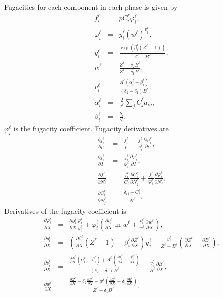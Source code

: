 Fugacities for each component in each phase is given by
\begin{eqnarray}
  f_i^\ell & = & p C_i^\ell \varphi_i^\ell, \\
  \varphi_i^\ell & = & y_i^\ell\left(w^\ell\right)^{v_i^\ell}, \\
  y_i^\ell & = & \frac{\exp\left(\beta_i^\ell (Z^\ell-1)\right)}
  {Z^\ell - B^\ell}, \\
  w^\ell & = & \frac{Z^\ell - \delta_2 B^\ell}{Z^\ell - \delta_1
    B^\ell}, \\
  v_i^\ell & = & \frac{A^\ell\left(\alpha_i^\ell-\beta_i^\ell\right)}
  {(\delta_2-\delta_1)B^\ell}, \\
  \alpha_i^\ell & = & \frac{2}{a^\ell}\sum_j C_j^\ell a_{ij}, \\
  \beta_i^\ell & = & \frac{b_i}{b^\ell}.
\end{eqnarray}
$\varphi_i^\ell$ is the fugacity coefficient. Fugacity derivatives are
\begin{eqnarray}
  \frac{\partial f_i^\ell}{\partial p} & = &
  \frac{f_i^\ell}{p} + \frac{f_i^\ell}{\varphi_i^\ell}
  \frac{\partial\varphi_i^\ell}{\partial p}, \\
  \frac{\partial f_i^\ell}{\partial T} & = &
  \frac{f_i^\ell}{\varphi_i^\ell}
  \frac{\partial\varphi_i^\ell}{\partial T}, \\
  \frac{\partial f_i^\ell}{\partial N_j^\ell} & = &
  \frac{f_i^\ell}{C_i^\ell} \frac{\partial C_i^\ell}{\partial N_j^\ell} +
  \frac{f_i^\ell}{\varphi_i^\ell}\frac{\partial\varphi_i^\ell}{\partial N_j^\ell}, \\
  \frac{\partial C_i^\ell}{\partial N_j^\ell} & = &
  \frac{\delta_{ij} - C_i^\ell}{N^\ell}.
\end{eqnarray}
Derivatives of the fugacity coefficient is
\begin{eqnarray}
  \frac{\partial\varphi_i^\ell}{\partial X} & = &
  \frac{\partial y_i^\ell}{\partial X} \frac{\varphi_i^\ell}{y_i^\ell} +
  \varphi_i^\ell\left(
    \frac{\partial v_i^\ell}{\partial X} \ln w^\ell +
    \frac{v_i^\ell}{w^\ell}\frac{\partial w^\ell}{\partial X}
  \right), \\
  \frac{\partial y_i^\ell}{\partial X} & = &
  \left(
    \frac{\partial\beta_i^\ell}{\partial X} (Z^\ell-1) +
    \beta_i^\ell \frac{\partial Z^\ell}{\partial X}
  \right) y_i^\ell -
  \frac{y_i^\ell}{Z^\ell-B^\ell}\left(
    \frac{\partial Z^\ell}{\partial X} -
    \frac{\partial B^\ell}{\partial X}
  \right), \\
  \frac{\partial v_i^\ell}{\partial X} & = &
  \frac{\frac{\partial A^\ell}{\partial
      X}\left(\alpha_i^\ell-\beta_i^\ell\right) +
    A^\ell\left(
      \frac{\partial\alpha_i^\ell}{\partial X} -
      \frac{\partial\beta_i^\ell}{\partial X}
    \right)}{\left(\delta_2-\delta_1\right) B^\ell} -
  \frac{v_i^\ell}{B^\ell}
  \frac{\partial B^\ell}{\partial X}, \\
  \frac{\partial w^\ell}{\partial X} & = &
  \frac{\frac{\partial Z^\ell}{\partial X} -
    \delta_2 \frac{\partial B^\ell}{\partial X}
    - w^\ell \left(
      \frac{\partial Z^\ell}{\partial X} -
      \delta_1 \frac{\partial B^\ell}{\partial X}
    \right)}{Z^\ell - \delta_1 B^\ell}.
\end{eqnarray}
